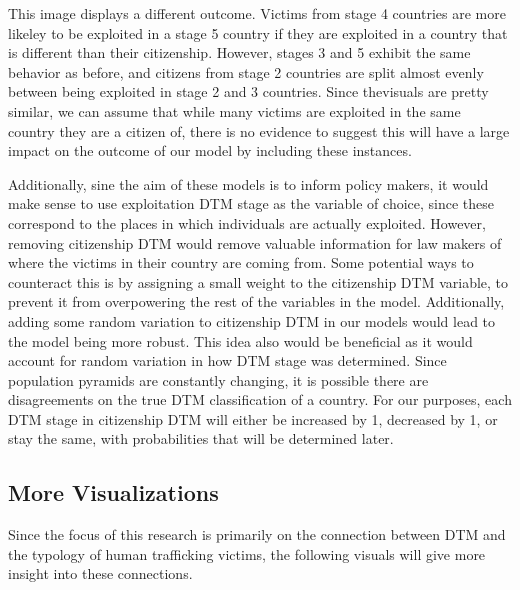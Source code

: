 \documentclass{article} %
\begin{document}
This image displays a different outcome. Victims from stage 4 countries are more likeley to be exploited in a stage 5 country if they are exploited in a country that is different than their citizenship. However, stages 3 and 5 exhibit the same behavior as before, and citizens from stage 2 countries are split almost evenly between being exploited in stage 2 and 3 countries. Since thevisuals are pretty similar, we can assume that while many victims are exploited in the same country they are a citizen of, there is no evidence to suggest this will have a large impact on the outcome of our model by including these instances. 

Additionally, sine the aim of these models is to inform policy makers, it would make sense to use exploitation DTM stage as the variable of choice, since these correspond to the places in which individuals are actually exploited. However, removing citizenship DTM would remove valuable information for law makers of where the victims in their country are coming from. 
Some potential ways to counteract this is by assigning a small weight to the citizenship DTM variable, to prevent it from overpowering the rest of the variables in the model. Additionally, adding some random variation to citizenship DTM in our models would lead to the model being more robust. This idea also would be beneficial as it would account for random variation in how DTM stage was determined. Since population pyramids are constantly changing, it is possible there are disagreements on the true DTM classification of a country. For our purposes, each DTM stage in citizenship DTM will either be increased by 1, decreased by 1, or stay the same, with probabilities that will be determined later.



\subsection{More Visualizations}

Since the focus of this research is primarily on the connection between DTM and the typology of human trafficking victims, the following visuals will give more insight into these connections.
\end{document}
